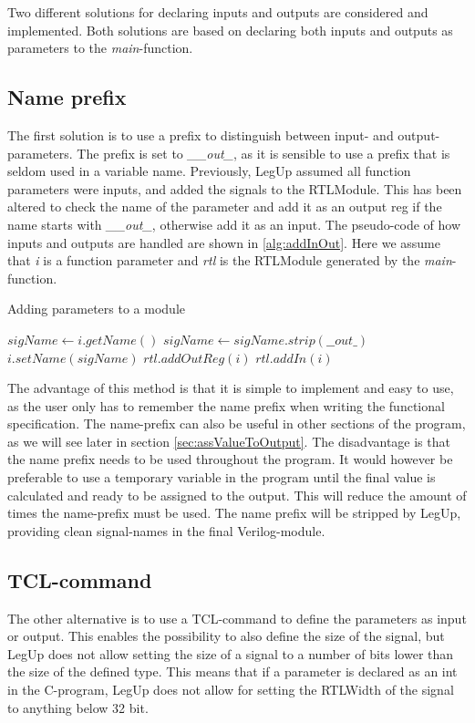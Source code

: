 Two different solutions for declaring inputs and outputs are considered and implemented. Both solutions are based on declaring both inputs and outputs as parameters to the \textit{main}-function.
\subsection{\label{subsec:inoutprefix}Name prefix}
The first solution is to use a prefix to distinguish between input- and output-parameters. The prefix is set to \textit{\_\_out\_}, as it is sensible to use a prefix that is seldom used in a variable name. Previously, LegUp assumed all function parameters were inputs, and added the signals to the RTLModule. This has been altered to check the name of the parameter and add it as an output reg if the name starts with \textit{\_\_out\_}, otherwise add it as an input. The pseudo-code of how inputs and outputs are handled are shown in \cref{alg:addInOut}. Here we assume that \textit{i} is a function parameter and \textit{rtl} is the RTLModule generated by the \textit{main}-function.

\begin{algorithm}
  \caption{\label{alg:addInOut}Adding parameters to a module}
  \begin{algorithmic}[1]
    \Statex
    \State $sigName \gets i.getName()$
      \State $sigName \gets sigName.strip(\_\_out\_)$
      \State $i.setName(sigName)$
      \State $rtl.addOutReg(i)$
    \Else
      \State $rtl.addIn(i)$
    \EndIf
  \end{algorithmic}
\end{algorithm}

The advantage of this method is that it is simple to implement and easy to use, as the user only has to remember the name prefix when writing the functional specification. The name-prefix can also be useful in other sections of the program, as we will see later in section \ref{sec:assValueToOutput}. The disadvantage is that the name prefix needs to be used throughout the program. It would however be preferable to use a temporary variable in the program until the final value is calculated and ready to be assigned to the output. This will reduce the amount of times the name-prefix must be used. The name prefix will be stripped by LegUp, providing clean signal-names in the final Verilog-module.
\subsection{\label{subsubsec:inoutparameter}TCL-command}
The other alternative is to use a TCL-command to define the parameters as input or output. This enables the possibility to also define the size of the signal, but LegUp does not allow setting the size of a signal to a number of bits lower than the size of the defined type. This means that if a parameter is declared as an int in the C-program, LegUp does not allow for setting the RTLWidth of the signal to anything below 32 bit.

